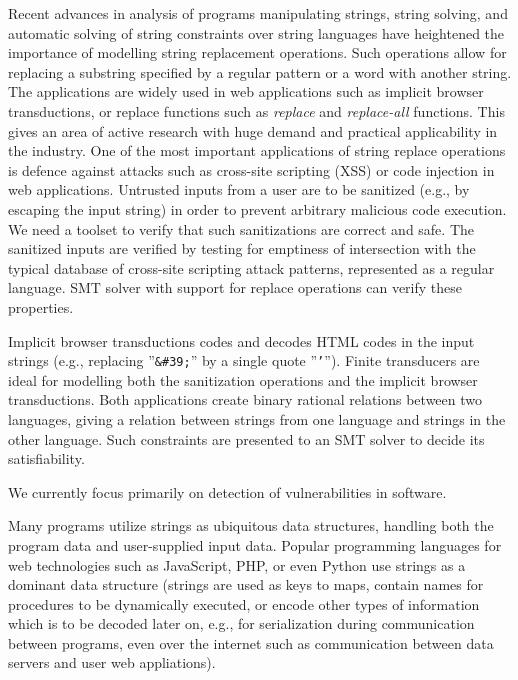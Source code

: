 Recent advances in analysis of programs manipulating strings, string solving, and automatic solving of string constraints over string languages have heightened the importance of modelling string replacement operations.
Such operations allow for replacing a substring specified by a regular pattern or a word with another string.
The applications are widely used in web applications such as implicit browser transductions, or replace functions such as \emph{replace} and \emph{replace-all} functions.
This gives an area of active research with huge demand and practical applicability in the industry.
One of the most important applications of string replace operations is defence against attacks such as cross-site scripting (XSS) or code injection in web applications.
Untrusted inputs from a user are to be sanitized (e.g., by escaping the input string) in order to prevent arbitrary malicious code execution.
We need a toolset to verify that such sanitizations are correct and safe.
The sanitized inputs are verified by testing for emptiness of intersection with the typical database of cross-site scripting attack patterns, represented as a regular language.
SMT solver with support for replace operations can verify these properties.

Implicit browser transductions codes and decodes HTML codes in the input strings (e.g., replacing ''\texttt{\&\#39;}'' by a single quote ''\texttt{'}'').
Finite transducers are ideal for modelling both the sanitization operations and the implicit browser transductions.
Both applications create binary rational relations between two languages, giving a relation between strings from one language and strings in the other language.
Such constraints are presented to an SMT solver to decide its satisfiability.

We currently focus primarily on detection of vulnerabilities in software.

Many programs utilize strings as ubiquitous data structures, handling both the program data and user-supplied input data.
Popular programming languages for web technologies such as JavaScript, PHP, or even Python use strings as a dominant data structure (strings are used as keys to maps, contain names for procedures to be dynamically executed, or encode other types of information which is to be decoded later on, e.g., for serialization during communication between programs, even over the internet such as communication between data servers and user web appliations).

